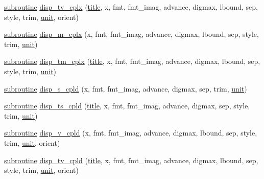 \begin{DoxyCompactItemize}
\item 
\hyperlink{M__stopwatch_83_8txt_acfbcff50169d691ff02d4a123ed70482}{subroutine} \hyperlink{interfacem__display_1_1disp_a7e509e0cf06b37ea49a5a3dc4c434d7e}{disp\+\_\+tv\+\_\+cplx} (\hyperlink{print__watch_83_8txt_a15b5bd21156bb9fca6a755ab8c029a9c}{title}, x, fmt, fmt\+\_\+imag, advance, digmax, lbound, sep, style, trim, \hyperlink{M__stopwatch_83_8txt_a5cbef30eb7c0d734bd82f5a7ebea9aa7}{unit}, orient)
\item 
\hyperlink{M__stopwatch_83_8txt_acfbcff50169d691ff02d4a123ed70482}{subroutine} \hyperlink{interfacem__display_1_1disp_a5be00101b8758e33ffd2bdca1ca2cb12}{disp\+\_\+m\+\_\+cplx} (x, fmt, fmt\+\_\+imag, advance, digmax, lbound, sep, style, trim, \hyperlink{M__stopwatch_83_8txt_a5cbef30eb7c0d734bd82f5a7ebea9aa7}{unit})
\item 
\hyperlink{M__stopwatch_83_8txt_acfbcff50169d691ff02d4a123ed70482}{subroutine} \hyperlink{interfacem__display_1_1disp_aa650fea8c9458654ba75ef39218297b6}{disp\+\_\+tm\+\_\+cplx} (\hyperlink{print__watch_83_8txt_a15b5bd21156bb9fca6a755ab8c029a9c}{title}, x, fmt, fmt\+\_\+imag, advance, digmax, lbound, sep, style, trim, \hyperlink{M__stopwatch_83_8txt_a5cbef30eb7c0d734bd82f5a7ebea9aa7}{unit})
\item 
\hyperlink{M__stopwatch_83_8txt_acfbcff50169d691ff02d4a123ed70482}{subroutine} \hyperlink{interfacem__display_1_1disp_a2a6976b3a0007c57a6bc0d0df174b1ec}{disp\+\_\+s\+\_\+cpld} (x, fmt, fmt\+\_\+imag, advance, digmax, sep, trim, \hyperlink{M__stopwatch_83_8txt_a5cbef30eb7c0d734bd82f5a7ebea9aa7}{unit})
\item 
\hyperlink{M__stopwatch_83_8txt_acfbcff50169d691ff02d4a123ed70482}{subroutine} \hyperlink{interfacem__display_1_1disp_a2aba4f3b1bb50c5d37a2d4c28cc66bf5}{disp\+\_\+ts\+\_\+cpld} (\hyperlink{print__watch_83_8txt_a15b5bd21156bb9fca6a755ab8c029a9c}{title}, x, fmt, fmt\+\_\+imag, advance, digmax, sep, style, trim, \hyperlink{M__stopwatch_83_8txt_a5cbef30eb7c0d734bd82f5a7ebea9aa7}{unit})
\item 
\hyperlink{M__stopwatch_83_8txt_acfbcff50169d691ff02d4a123ed70482}{subroutine} \hyperlink{interfacem__display_1_1disp_a00c7fb8cd1a10b342eef9650397cb13d}{disp\+\_\+v\+\_\+cpld} (x, fmt, fmt\+\_\+imag, advance, digmax, lbound, sep, style, trim, \hyperlink{M__stopwatch_83_8txt_a5cbef30eb7c0d734bd82f5a7ebea9aa7}{unit}, orient)
\item 
\hyperlink{M__stopwatch_83_8txt_acfbcff50169d691ff02d4a123ed70482}{subroutine} \hyperlink{interfacem__display_1_1disp_a862ad2fa9a0f4b9e1c65fb724b201f19}{disp\+\_\+tv\+\_\+cpld} (\hyperlink{print__watch_83_8txt_a15b5bd21156bb9fca6a755ab8c029a9c}{title}, x, fmt, fmt\+\_\+imag, advance, digmax, lbound, sep, style, trim, \hyperlink{M__stopwatch_83_8txt_a5cbef30eb7c0d734bd82f5a7ebea9aa7}{unit}, orient)

\end{DoxyCompactItemize}
